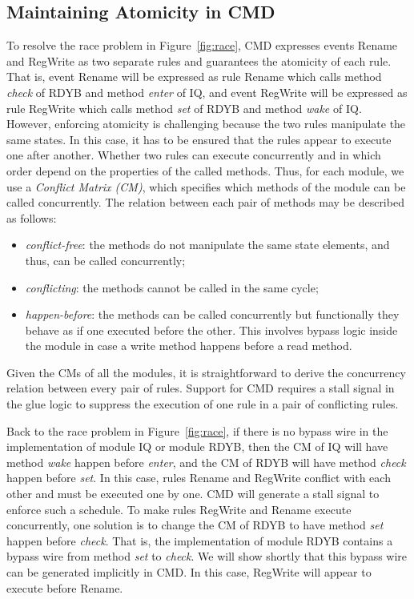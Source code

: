 \documentclass[conference]{IEEEtran}
\begin{document}
\subsection{Maintaining Atomicity in CMD}
To resolve the race problem in Figure~\ref{fig:race}, CMD expresses events Rename and RegWrite as two separate rules and guarantees the atomicity of each rule.
That is, event Rename will be expressed as rule Rename which calls method \emph{check} of RDYB and method \emph{enter} of IQ, and event RegWrite will be expressed as rule RegWrite which calls method \emph{set} of RDYB and method \emph{wake} of IQ.
However, enforcing atomicity is challenging because the two rules manipulate the same states.
In this case, it has to be ensured that the rules appear to execute one after another.
Whether two rules can execute concurrently and in which order depend on the properties of the called methods.
Thus, for each module, we use a \emph{Conflict Matrix (CM)}, which specifies which methods of the module can be called concurrently.
The relation between each pair of methods may be described as follows:
\begin{itemize}
    \item \emph{conflict-free}: the methods do not manipulate the same state elements, and thus, can be called concurrently;
    \item \emph{conflicting}: the methods cannot be called in the same cycle;
    \item \emph{happen-before}: the methods can be called concurrently but functionally they behave as if one executed before the other.
    This involves bypass logic inside the module in case a write method happens before a read method.
\end{itemize}
Given the CMs of all the modules, it is straightforward to derive the concurrency relation between every pair of rules.
Support for CMD requires a stall signal in the glue logic to suppress the execution of one rule in a pair of conflicting rules.

Back to the race problem in Figure~\ref{fig:race}, if there is no bypass wire in the implementation of module IQ or module RDYB, then the CM of IQ will have method \emph{wake} happen before \emph{enter}, and the CM of RDYB will have method \emph{check} happen before \emph{set}.
In this case, rules Rename and RegWrite conflict with each other and must be executed one by one. CMD will generate a stall signal to enforce such a schedule.
To make rules RegWrite and Rename execute concurrently, one solution is to change the CM of RDYB to have method \emph{set} happen before \emph{check}.
That is, the implementation of module RDYB contains a bypass wire from method \emph{set} to \emph{check}.
We will show shortly that this bypass wire can be generated implicitly in CMD.
In this case, RegWrite will appear to execute before Rename.
\end{document}
